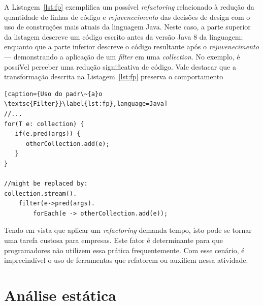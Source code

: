 
A Listagem~\ref{lst:fp} exemplifica um poss\'{i}vel \emph{refactoring} relacionado \`{a} 
redu\c c\~{a}o da quantidade de linhas de c\'{o}digo e \emph{rejuvenecimento} 
das decis\~{o}es de design com o uso de constru\c c\~{o}es mais atuais da 
linguagem Java. Neste caso, a parte superior da listagem descreve um c\'{o}digo 
escrito antes da vers\~{a}o Java 8 da linguagem; enquanto que a parte inferior descreve o 
c\'{o}digo resultante ap\'{o}s o \emph{rejuvenecimento}--- demonstrando a   
aplica\c c\~{a}o de um {\it filter} em uma {\it collection}. No exemplo, \'{e}  
poss\'{i}Vel perceber uma redu\c{c}\~{a}o significativa de c\'{o}digo. 
Vale destacar que a transforma\c c\~{a}o descrita
na Listagem~\ref{lst:fp} preserva o comportamento


\begin{lstlisting}[caption={Uso do padr\~{a}o \textsc{Filter}}\label{lst:fp},language=Java] 
//...
for(T e: collection) {
   if(e.pred(args)) {
      otherCollection.add(e);
   }
}

//might be replaced by:
collection.stream().
	filter(e->pred(args).
		forEach(e -> otherCollection.add(e));
\end{lstlisting}




Tendo em vista que aplicar um \textit{refactoring} demanda tempo, 
isto pode se tornar uma tarefa custosa para empresas. Este fator \'{e} determinante 
para que programadores n\~{a}o utilizem essa pr\'{a}tica frequentemente. Com esse 
cen\'{a}rio, \'{e} imprecind\'{i}vel o uso de ferramentas que refatorem ou auxiliem 
nessa atividade. 


\section{Análise estática}\label{sec:as}

